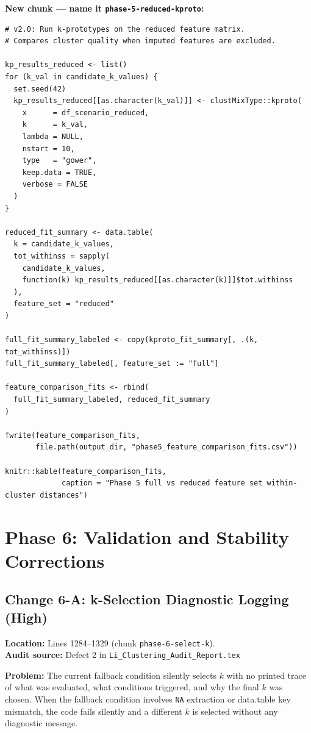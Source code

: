 \documentclass[11pt]{article}
\newcommand{\rfile}[1]{\texttt{#1}}
\newcommand{\rcode}[1]{\texttt{#1}}
\begin{document}
\textbf{New chunk --- name it \rcode{phase-5-reduced-kproto}:}
\begin{lstlisting}
# v2.0: Run k-prototypes on the reduced feature matrix.
# Compares cluster quality when imputed features are excluded.

kp_results_reduced <- list()
for (k_val in candidate_k_values) {
  set.seed(42)
  kp_results_reduced[[as.character(k_val)]] <- clustMixType::kproto(
    x      = df_scenario_reduced,
    k      = k_val,
    lambda = NULL,
    nstart = 10,
    type   = "gower",
    keep.data = TRUE,
    verbose = FALSE
  )
}

reduced_fit_summary <- data.table(
  k = candidate_k_values,
  tot_withinss = sapply(
    candidate_k_values,
    function(k) kp_results_reduced[[as.character(k)]]$tot.withinss
  ),
  feature_set = "reduced"
)

full_fit_summary_labeled <- copy(kproto_fit_summary[, .(k, tot_withinss)])
full_fit_summary_labeled[, feature_set := "full"]

feature_comparison_fits <- rbind(
  full_fit_summary_labeled, reduced_fit_summary
)

fwrite(feature_comparison_fits,
       file.path(output_dir, "phase5_feature_comparison_fits.csv"))

knitr::kable(feature_comparison_fits,
             caption = "Phase 5 full vs reduced feature set within-cluster distances")
\end{lstlisting}

\section{Phase 6: Validation and Stability Corrections}

\subsection{Change 6-A: k-Selection Diagnostic Logging (High)}

\textbf{Location:} Lines 1284--1329 (chunk \rcode{phase-6-select-k}).\\
\textbf{Audit source:} Defect 2 in \rfile{Li\_Clustering\_Audit\_Report.tex}

\textbf{Problem:} The current fallback condition silently selects $k$ with
no printed trace of what was evaluated, what conditions triggered, and
why the final $k$ was chosen. When the fallback condition involves
\rcode{NA} extraction or data.table key mismatch, the code fails silently
and a different $k$ is selected without any diagnostic message.
\end{document}
